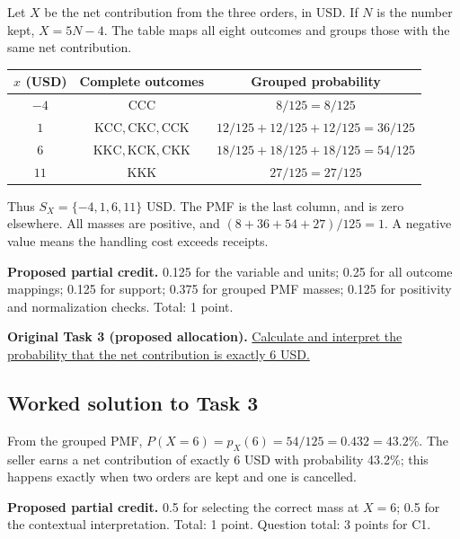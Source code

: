 Let $X$ be the net contribution from the three orders, in USD. If $N$ is the number kept, $X=5N-4$. The table maps all eight outcomes and groups those with the same net contribution.

\begin{center}
\begin{tabular}{ccc}\toprule
$x$ (USD) & Complete outcomes & Grouped probability\\\midrule
$-4$ & $\mathrm{CCC}$ & $8/125=8/125$\\
$1$ & $\mathrm{KCC},\mathrm{CKC},\mathrm{CCK}$ & $12/125+12/125+12/125=36/125$\\
$6$ & $\mathrm{KKC},\mathrm{KCK},\mathrm{CKK}$ & $18/125+18/125+18/125=54/125$\\
$11$ & $\mathrm{KKK}$ & $27/125=27/125$\\
\bottomrule\end{tabular}
\end{center}


Thus $S_X=\{-4,1,6,11\}$ USD. The PMF is the last column, and is zero elsewhere. All masses are positive, and $(8+36+54+27)/125=1$. A negative value means the handling cost exceeds receipts.

\textbf{Proposed partial credit.} 0.125 for the variable and units; 0.25 for all outcome mappings; 0.125 for support; 0.375 for grouped PMF masses; 0.125 for positivity and normalization checks. Total: 1 point.

\par\vspace{3mm}\secInicio[][sec:q1]

\textbf{Original Task 3 (proposed allocation).} \hyperref[sol:q1t3]{Calculate and interpret the probability that the net contribution is exactly 6 USD.} 


\subsection*{Worked solution to Task 3 }
\label{sol:q1t3}

From the grouped PMF, $P(X=6)=p_X(6)=54/125=0.432=43.2\%$. The seller earns a net contribution of exactly 6 USD with probability 43.2\%; this happens exactly when two orders are kept and one is cancelled.

\textbf{Proposed partial credit.} 0.5 for selecting the correct mass at $X=6$; 0.5 for the contextual interpretation. Total: 1 point. Question total: 3 points for C1.

\par\vspace{3mm}\secInicio[][sec:q1]

